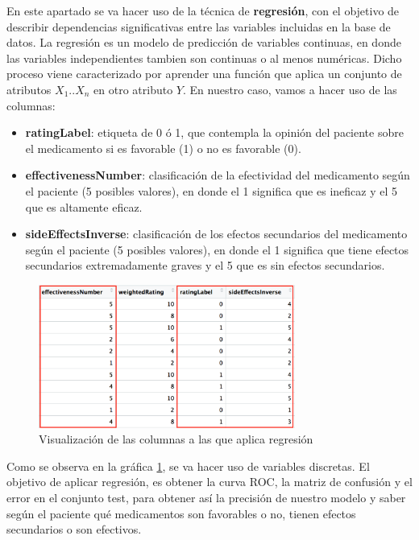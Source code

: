 \documentclass[spanish,]{article}
\providecommand{\tightlist}{%
  \setlength{\itemsep}{0pt}\setlength{\parskip}{0pt}}
\begin{document}
En este apartado se va hacer uso de la técnica de \textbf{regresión},
con el objetivo de describir dependencias significativas entre las
variables incluidas en la base de datos. La regresión es un modelo de
predicción de variables continuas, en donde las variables independientes
tambien son continuas o al menos numéricas. Dicho proceso viene
caracterizado por aprender una función que aplica un conjunto de
atributos \(X_1..X_n\) en otro atributo \(Y\). En nuestro caso, vamos a
hacer uso de las columnas:

\begin{itemize}
\tightlist
\item
  \textbf{ratingLabel}: etiqueta de 0 ó 1, que contempla la opinión del
  paciente sobre el medicamento si es favorable (1) o no es favorable
  (0).
\item
  \textbf{effectivenessNumber}: clasificación de la efectividad del
  medicamento según el paciente (5 posibles valores), en donde el 1
  significa que es ineficaz y el 5 que es altamente eficaz.
\item
  \textbf{sideEffectsInverse}: clasificación de los efectos secundarios
  del medicamento según el paciente (5 posibles valores), en donde el 1
  significa que tiene efectos secundarios extremadamente graves y el 5
  que es sin efectos secundarios.
\end{itemize}

\begin{figure}[h]
    \centering
    \includegraphics[width=0.75\textwidth]{imagenes/regresion/1.png}
    \caption{Visualización de las columnas a las que aplica regresión}
    \label{1}
\end{figure}

Como se observa en la gráfica \ref{1}, se va hacer uso de variables
discretas. El objetivo de aplicar regresión, es obtener la curva ROC, la
matriz de confusión y el error en el conjunto test, para obtener así la
precisión de nuestro modelo y saber según el paciente qué medicamentos
son favorables o no, tienen efectos secundarios o son efectivos.
\end{document}
